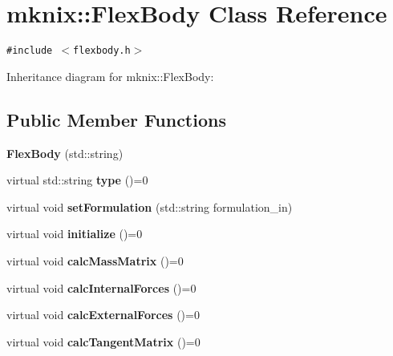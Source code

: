 \hypertarget{classmknix_1_1FlexBody}{
\section{mknix::FlexBody Class Reference}
\label{classmknix_1_1FlexBody}
}
{\tt \#include $<$flexbody.h$>$}

Inheritance diagram for mknix::FlexBody:\subsection*{Public Member Functions}
\begin{CompactItemize}
\item 
\hypertarget{classmknix_1_1FlexBody_83a9548bf5422f10ab3753d23c1d2f27}{
\textbf{FlexBody} (std::string)}
\label{classmknix_1_1FlexBody_83a9548bf5422f10ab3753d23c1d2f27}

\item 
\hypertarget{classmknix_1_1FlexBody_2da6b1d95ba70a5fe2cdfe32173dbfdb}{
virtual std::string \textbf{type} ()=0}
\label{classmknix_1_1FlexBody_2da6b1d95ba70a5fe2cdfe32173dbfdb}

\item 
\hypertarget{classmknix_1_1FlexBody_a079c60afebfc32e1282246cb9045c3a}{
virtual void \textbf{setFormulation} (std::string formulation\_\-in)}
\label{classmknix_1_1FlexBody_a079c60afebfc32e1282246cb9045c3a}

\item 
\hypertarget{classmknix_1_1FlexBody_87ede86c3ade1e700a706c41ce31b2c1}{
virtual void \textbf{initialize} ()=0}
\label{classmknix_1_1FlexBody_87ede86c3ade1e700a706c41ce31b2c1}

\item 
\hypertarget{classmknix_1_1FlexBody_edae7aced2e98611154e5ffcfbe2ff39}{
virtual void \textbf{calcMassMatrix} ()=0}
\label{classmknix_1_1FlexBody_edae7aced2e98611154e5ffcfbe2ff39}

\item 
\hypertarget{classmknix_1_1FlexBody_c7bd6a11a097cd7c540d94e2c1f9d617}{
virtual void \textbf{calcInternalForces} ()=0}
\label{classmknix_1_1FlexBody_c7bd6a11a097cd7c540d94e2c1f9d617}

\item 
\hypertarget{classmknix_1_1FlexBody_30178d1ff55e8e4c5e1b85ff8c2ec09b}{
virtual void \textbf{calcExternalForces} ()=0}
\label{classmknix_1_1FlexBody_30178d1ff55e8e4c5e1b85ff8c2ec09b}

\item 
\hypertarget{classmknix_1_1FlexBody_7717a6111a89fa8bf0f52cd0ba77943e}{
virtual void \textbf{calcTangentMatrix} ()=0}
\label{classmknix_1_1FlexBody_7717a6111a89fa8bf0f52cd0ba77943e}


\end{CompactItemize}
